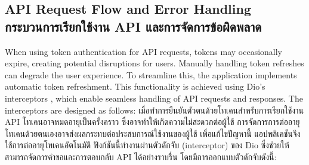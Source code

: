 \subsection{\ifenglish API Request Flow and Error Handling \else กระบวนการเรียกใช้งาน API และการจัดการข้อผิดพลาด \fi}

\ifenglish
When using token authentication for API requests, tokens may occasionally expire, creating potential disruptions for users. Manually handling token refreshes can degrade the user experience. To streamline this, the application implements automatic token refreshment. This functionality is achieved using Dio’s interceptors \cite{dio-doc}, which enable seamless handling of API requests and responses. The interceptors are designed as follows:
\else
เมื่อทำการยืนยันตัวตนด้วยโทเคนสำหรับการเรียกใช้งาน API โทเคนอาจหมดอายุเป็นครั้งคราว ซึ่งอาจทำให้เกิดความไม่สะดวกต่อผู้ใช้ การจัดการการต่ออายุโทเคนด้วยตนเองอาจส่งผลกระทบต่อประสบการณ์ใช้งานของผู้ใช้ เพื่อแก้ไขปัญหานี้ แอปพลิเคชันจึงใช้การต่ออายุโทเคนอัตโนมัติ ฟังก์ชันนี้ทำงานผ่านตัวดักจับ (interceptor) ของ Dio \cite{dio-doc} ซึ่งช่วยให้สามารถจัดการคำขอและการตอบกลับ API ได้อย่างราบรื่น โดยมีการออกแบบตัวดักจับดังนี้:
\fi

